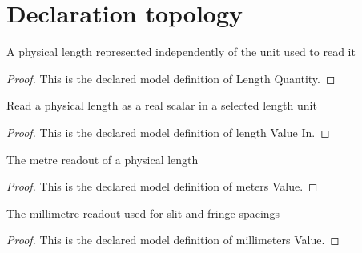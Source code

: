 \section{Declaration topology}
\begin{definition}
  \label{def:physics:phyx-mini-0125:phyxminiproblems-problemphyxmini0125-lengthquantity}
  A physical length represented independently of the unit used to read it
\end{definition}
\begin{proof}
  This is the declared model definition of Length Quantity.
\end{proof}
\begin{definition}
  \label{def:physics:phyx-mini-0125:phyxminiproblems-problemphyxmini0125-lengthvaluein}
  Read a physical length as a real scalar in a selected length unit
\end{definition}
\begin{proof}
  This is the declared model definition of length Value In.
\end{proof}
\begin{definition}
  \label{def:physics:phyx-mini-0125:phyxminiproblems-problemphyxmini0125-metersvalue}
  The metre readout of a physical length
\end{definition}
\begin{proof}
  This is the declared model definition of meters Value.
\end{proof}
\begin{definition}
  \label{def:physics:phyx-mini-0125:phyxminiproblems-problemphyxmini0125-millimetersvalue}
  The millimetre readout used for slit and fringe spacings
\end{definition}
\begin{proof}
  This is the declared model definition of millimeters Value.
\end{proof}

